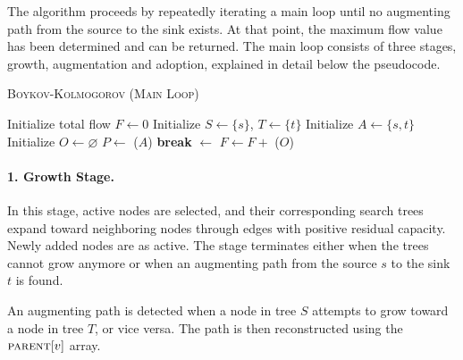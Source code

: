 The algorithm proceeds by repeatedly iterating a main loop until no augmenting path from the source to the sink exists. At that point, the maximum flow value has been determined and can be returned.
The main loop consists of three stages, growth, augmentation and adoption, explained in detail below the pseudocode.

\begin{algorithm}[H]
\caption{\textsc{Boykov-Kolmogorov  (Main Loop)}}
\begin{algorithmic}[1]
\State Initialize total flow $F \gets 0$
\State Initialize $S \gets \{s\}$, $T \gets \{t\}$
\State Initialize $A \gets \{s, t\}$ 
\State Initialize $O \gets \varnothing$ 
    \State $P \gets$ ($A$)
        \State \textbf{break}
    \EndIf
\State {} $\gets$ 
\State $F \gets F +$ 
    \State {}($O$)
\EndWhile
\State {}
\end{algorithmic}
\end{algorithm}

\paragraph*{1. Growth Stage.}  
In this stage, active nodes are selected, and their corresponding search trees expand toward neighboring nodes through edges with positive residual capacity. Newly added nodes are as active. The stage terminates either when the trees cannot grow anymore or when an augmenting path from the source $s$ to the sink $t$ is found.

An augmenting path is detected when a node in tree $S$ attempts to grow toward a node in tree $T$, or vice versa. The path is then reconstructed using the $\textsc{parent}[v]$ array.

